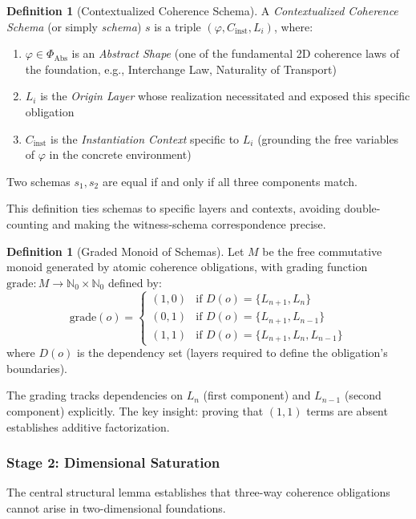\documentclass[11pt]{article}
\theoremstyle{definition}
\newtheorem{definition}[theorem]{Definition}
\theoremstyle{remark}
\begin{document}
\begin{definition}[Contextualized Coherence Schema]
\label{def:contextualized-schema}
A \emph{Contextualized Coherence Schema} (or simply \emph{schema}) $s$ is a triple $(\varphi, C_{\text{inst}}, L_i)$,
where:
\begin{enumerate}
\item $\varphi \in \Phi_{\text{Abs}}$ is an \emph{Abstract Shape} (one of the fundamental 2D coherence laws
of the foundation, e.g., Interchange Law, Naturality of Transport)
\item $L_i$ is the \emph{Origin Layer} whose realization necessitated and exposed this specific obligation
\item $C_{\text{inst}}$ is the \emph{Instantiation Context} specific to $L_i$ (grounding the free variables of
$\varphi$ in the concrete environment)
\end{enumerate}
Two schemas $s_1, s_2$ are equal if and only if all three components match.
\end{definition}

This definition ties schemas to specific layers and contexts, avoiding double-counting and making
the witness-schema correspondence precise.

\begin{definition}[Graded Monoid of Schemas]
\label{def:graded-monoid}
Let $M$ be the free commutative monoid generated by atomic coherence obligations, with grading
function $\text{grade}: M \to \mathbb{N}_0 \times \mathbb{N}_0$ defined by:
\[
\text{grade}(o) = \begin{cases}
(1, 0) & \text{if } D(o) = \{L_{n+1}, L_n\} \\
(0, 1) & \text{if } D(o) = \{L_{n+1}, L_{n-1}\} \\
(1, 1) & \text{if } D(o) = \{L_{n+1}, L_n, L_{n-1}\}
\end{cases}
\]
where $D(o)$ is the dependency set (layers required to define the obligation's boundaries).
\end{definition}

The grading tracks dependencies on $L_n$ (first component) and $L_{n-1}$ (second component) explicitly.
The key insight: proving that $(1,1)$ terms are absent establishes additive factorization.

\subsubsection{Stage 2: Dimensional Saturation}

The central structural lemma establishes that three-way coherence obligations cannot arise in
two-dimensional foundations.
\end{document}
